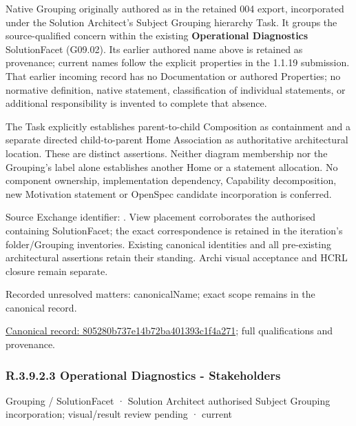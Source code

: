 Native Grouping originally authored as \texttt{} in the retained 004 export,
incorporated under the Solution Architect's Subject Grouping hierarchy Task.
It groups the source-qualified \texttt{} concern within
the existing \textbf{Operational Diagnostics} SolutionFacet (G09.02). Its earlier authored name above is retained as provenance; current names
follow the explicit properties in the 1.1.19 submission.
That earlier incoming record has no Documentation or authored Properties; no normative
definition, native statement, classification of individual statements, or
additional responsibility is invented to complete that absence.



The Task explicitly establishes parent-to-child Composition as containment and
a separate directed child-to-parent Home Association as authoritative architectural
location. These are distinct assertions. Neither diagram membership nor the
Grouping's label alone establishes another Home or a statement allocation.
No component ownership, implementation dependency, Capability decomposition,
new Motivation statement or OpenSpec candidate incorporation is conferred.



Source Exchange identifier: \texttt{}. View placement corroborates
the authorised containing SolutionFacet; the exact correspondence is retained in the
iteration's folder/Grouping inventories. Existing canonical identities and all
pre-existing architectural assertions retain their standing. Archi visual
acceptance and HCRL closure remain separate.


{\small Recorded unresolved matters: canonicalName; exact scope remains in the canonical record.}\par
{\footnotesize \href{../../../../../../../continuum/grouping/805280b737e14b72ba401393c1f4a271.md}{Canonical record: 805280b737e14b72ba401393c1f4a271}; full qualifications and provenance.}\par
\subsubsection*{R.3.9.2.3 Operational Diagnostics - Stakeholders}
\label{navigation:R.3.9.2.3}

\label{element:67bfa710070c4618b3ba834da62cc63d}
{\small Grouping / SolutionFacet · Solution Architect authorised Subject Grouping incorporation; visual/result review pending · current}\par

